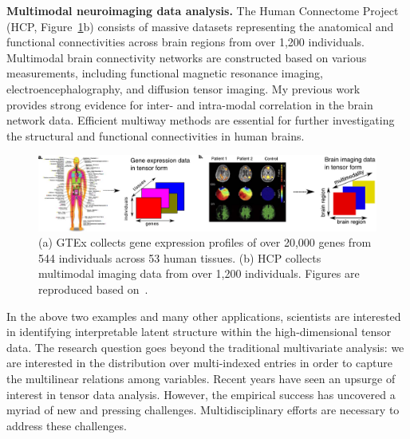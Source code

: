 \documentclass[11pt]{article}
\theoremstyle{exampstyle}
\theoremstyle{definition}
\begin{document}
{\bf Multimodal neuroimaging data analysis.} The Human Connectome Project (HCP, Figure~\ref{fig:intro}b) consists of massive datasets representing the anatomical and functional connectivities across brain regions from over 1,200 individuals. Multimodal brain connectivity networks are constructed based on various measurements, including functional magnetic resonance imaging, electroencephalography, and diffusion tensor imaging. My previous work~\cite{wang2018learning,pmlr-v119-lee20i} provides strong evidence for inter- and intra-modal correlation in the brain network data. Efficient multiway methods are essential for further investigating the structural and functional connectivities in human brains. 
\begin{figure}[http]
\begin{center}
\includegraphics[width=1\textwidth]{example.pdf}
\vspace{-.8cm}
\caption{(a) GTEx collects gene expression profiles of over 20,000 genes from 544 individuals across 53 human tissues. (b) HCP collects multimodal imaging data from over 1,200 individuals. Figures are reproduced based on~\cite{timpson2018genetic, bruno2011multimodal}.}\label{fig:intro}
\vspace{-.6cm}
\end{center}
\end{figure} 

In the above two examples and many other applications, scientists are interested in identifying interpretable latent structure within the high-dimensional tensor data. The research question goes beyond the traditional multivariate analysis: we are interested in the distribution over multi-indexed entries in order to capture the multilinear relations among variables. Recent years have seen an upsurge of interest in tensor data analysis. However, the empirical success has uncovered a myriad of new and pressing challenges. Multidisciplinary efforts are necessary to address these challenges.
\end{document}
